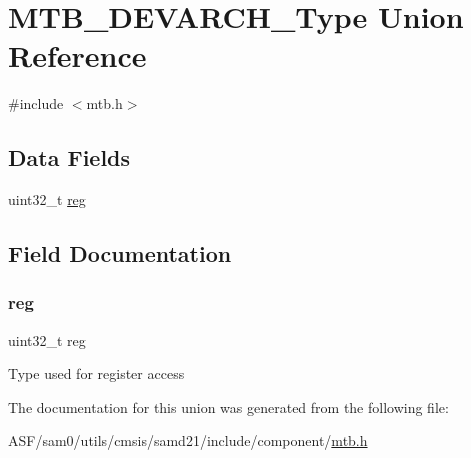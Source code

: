 \hypertarget{union_m_t_b___d_e_v_a_r_c_h___type}{}\section{M\+T\+B\+\_\+\+D\+E\+V\+A\+R\+C\+H\+\_\+\+Type Union Reference}
\label{union_m_t_b___d_e_v_a_r_c_h___type}


{\ttfamily \#include $<$mtb.\+h$>$}

\subsection*{Data Fields}
\begin{DoxyCompactItemize}
\item 
uint32\+\_\+t \mbox{\hyperlink{union_m_t_b___d_e_v_a_r_c_h___type_a6b91636401516a477989a336376d7b40}{reg}}
\end{DoxyCompactItemize}


\subsection{Field Documentation}
\mbox{\label{union_m_t_b___d_e_v_a_r_c_h___type_a6b91636401516a477989a336376d7b40}} 
\subsubsection{\texorpdfstring{reg}{reg}}
{\footnotesize\ttfamily uint32\+\_\+t reg}

Type used for register access 

The documentation for this union was generated from the following file\+:\begin{DoxyCompactItemize}
\item 
A\+S\+F/sam0/utils/cmsis/samd21/include/component/\mbox{\hyperlink{component_2mtb_8h}{mtb.\+h}}\end{DoxyCompactItemize}
